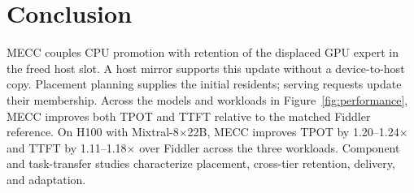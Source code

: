 \section{Conclusion}
MECC couples CPU promotion with retention of the displaced GPU expert in the freed host slot.
A host mirror supports this update without a device-to-host copy.
Placement planning supplies the initial residents; serving requests update their membership.
Across the models and workloads in Figure~\ref{fig:performance}, MECC improves both TPOT and TTFT relative to the matched Fiddler reference.
On H100 with Mixtral-8$\times$22B, MECC improves TPOT by 1.20--1.24$\times$ and TTFT by 1.11--1.18$\times$ over Fiddler across the three workloads.
Component and task-transfer studies characterize placement, cross-tier retention, delivery, and adaptation.

